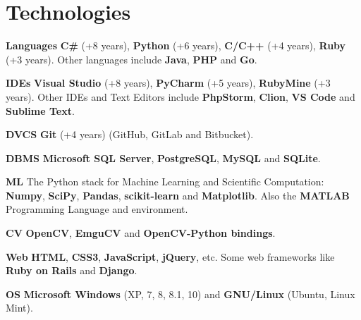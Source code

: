\documentclass[]{friggeri-cv}
\begin{document}
\section{Technologies}
\begin{entrylist}
  \entry
    {\textbf{Languages}}
    {}
    {}
    {\textbf{C\#} (+8 years), \textbf{Python} (+6 years), \textbf{C/C++} (+4 years), \textbf{Ruby} (+3 years). Other languages include \textbf{Java}, \textbf{PHP} and \textbf{Go}. }

  \entry
    {\textbf{IDEs}}
    {}
    {}
    {\textbf{Visual Studio} (+8 years), \textbf{PyCharm} (+5 years), \textbf{RubyMine} (+3 years). Other IDEs and Text Editors include \textbf{PhpStorm}, \textbf{Clion}, \textbf{VS Code} and \textbf{Sublime Text}.}

  \entry
    {\textbf{DVCS}}
    {}
    {}
    {\textbf{Git} (+4 years) (GitHub, GitLab and Bitbucket).}
    
  \entry
    {\textbf{DBMS}}
    {}
    {}
    {\textbf{Microsoft SQL Server}, \textbf{PostgreSQL}, \textbf{MySQL} and \textbf{SQLite}.}

  \entry
    {\textbf{ML}}
    {}
    {}
    {The Python stack for Machine Learning and Scientific Computation: \textbf{Numpy}, \textbf{SciPy}, \textbf{Pandas}, \textbf{scikit-learn} and \textbf{Matplotlib}. Also the \textbf{MATLAB} Programming Language and environment.}
    
  \entry
    {\textbf{CV}}
    {}
    {}
    {\textbf{OpenCV}, \textbf{EmguCV} and \textbf{OpenCV-Python bindings}.}    
    
  \entry
    {\textbf{Web}}
    {}
    {}
    {\textbf{HTML}, \textbf{CSS3}, \textbf{JavaScript}, \textbf{jQuery}, etc. Some web frameworks like \textbf{Ruby on Rails} and \textbf{Django}.}    
    
  \entry
    {\textbf{OS}}
    {}
    {}
    {\textbf{Microsoft Windows} (XP, 7, 8, 8.1, 10) and \textbf{GNU/Linux} (Ubuntu, Linux Mint).}
\end{entrylist}
\\
\end{document}
